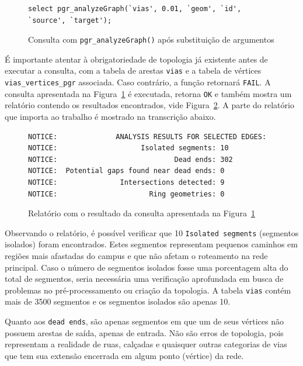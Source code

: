 \documentclass[oneside,openright,12pt]{ufsm_2015} %
\begin{document}
\begin{figure}[h!]
    \centering
    \caption{Consulta com {\tt pgr\_analyzeGraph()} após substituição de argumentos}
    \label{codigo:analyzeGraph_final-1}
    \begin{lstlisting}[]
select pgr_analyzeGraph(`vias', 0.01, `geom', `id', `source', `target');
\end{lstlisting}
\end{figure}


É importante atentar à obrigatoriedade de topologia já existente antes de executar a consulta, com a tabela de arestas {\tt vias} e a tabela de vértices {\tt vias\_vertices\_pgr} associada. 
Caso contrário, a função retornará {\tt FAIL}. 
A consulta apresentada na Figura~\ref{codigo:analyzeGraph_final-1} é executada, retorna {\tt OK} e também mostra um relatório contendo os resultados encontrados, vide Figura~\ref{relatorio}. 
A parte do relatório que importa ao trabalho é mostrado na transcrição abaixo.


\begin{figure}
    \centering
     \caption{Relatório com o resultado da consulta apresentada na Figura~\ref{codigo:analyzeGraph_final-1}}
    \label{relatorio}
    \begin{verbatim}
NOTICE:              ANALYSIS RESULTS FOR SELECTED EDGES:
NOTICE:                    Isolated segments: 10
NOTICE:                            Dead ends: 302
NOTICE:  Potential gaps found near dead ends: 0
NOTICE:               Intersections detected: 9
NOTICE:                      Ring geometries: 0  
\end{verbatim}
\end{figure}





Observando o relatório, é possível verificar que 10 {\tt Isolated segments} (segmentos isolados) foram encontrados. 
Estes segmentos representam pequenos caminhos em regiões mais afastadas do campus e que não afetam o roteamento na rede principal. 
Caso o número de segmentos isolados fosse uma porcentagem alta do total de segmentos, seria necessária uma verificação aprofundada em busca de problemas no pré-processamento ou criação da topologia.
A tabela {\tt vias} contém mais de 3500 segmentos e os segmentos isolados são apenas 10.

Quanto aos {\tt dead ends}, são apenas segmentos em que um de seus vértices não possuem arestas de saída, apenas de entrada. 
Não são erros de topologia, pois representam a realidade de ruas, calçadas e quaisquer outras categorias de vias que tem sua extensão encerrada em algum ponto (vértice) da rede.
\end{document}
